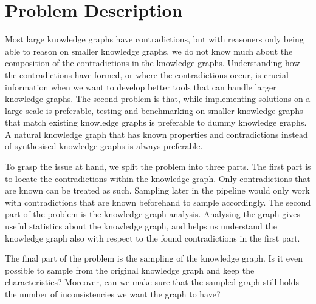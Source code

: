 \documentclass[11pt,letterpaper ,oneside ]{book}
\begin{document}
	\section{Problem Description}
	Most large knowledge graphs have contradictions, but with reasoners only being able to reason on smaller knowledge graphs, we do not know much about the composition of the contradictions in the knowledge graphs. Understanding how the contradictions have formed, or where the contradictions occur, is crucial information when we want to develop better tools that can handle larger knowledge graphs. The second problem is that, while implementing solutions on a large scale is preferable, testing and benchmarking on smaller knowledge graphs that match existing knowledge graphs is preferable to dummy knowledge graphs. A natural knowledge graph that has known properties and contradictions instead of synthesised knowledge graphs is always preferable. 
	
	To grasp the issue at hand, we split the problem into three parts. The first part is to locate the contradictions within the knowledge graph. Only contradictions that are known can be treated as such. Sampling later in the pipeline would only work with contradictions that are known beforehand to sample accordingly.
	The second part of the problem is the knowledge graph analysis. Analysing the graph gives useful statistics about the knowledge graph, and helps us understand the knowledge graph also with respect to the found contradictions in the first part.
	
	The final part of the problem is the sampling of the knowledge graph. Is it even possible to sample from the original knowledge graph and keep the characteristics? Moreover, can we make sure that the sampled graph still holds the number of inconsistencies we want the graph to have? 
	
\end{document}
